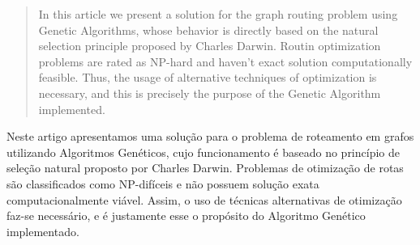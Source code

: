 
\begin{abstract}
In this article we present a solution for the graph routing problem using Genetic Algorithms, whose behavior is directly based on the natural selection principle proposed by Charles Darwin. Routin optimization problems are rated as NP-hard and haven't exact solution computationally feasible. Thus, the usage of alternative techniques of optimization is necessary, and this is precisely the purpose of the Genetic Algorithm implemented.
\end{abstract}
     
\begin{resumo} 
Neste artigo apresentamos uma solução para o problema de roteamento em grafos utilizando Algoritmos Genéticos, cujo funcionamento é baseado no princípio de seleção natural proposto por Charles Darwin. Problemas de otimização de rotas são classificados como NP-difíceis e não possuem solução exata computacionalmente viável. Assim, o uso de técnicas alternativas de otimização faz-se necessário, e é justamente esse o propósito do Algoritmo Genético implementado.
\end{resumo}

